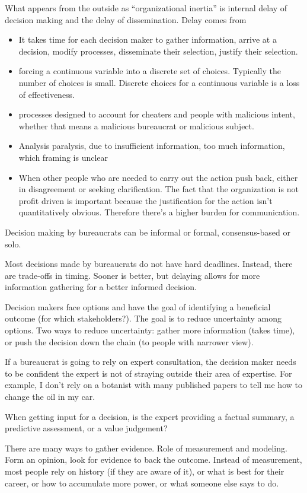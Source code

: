 What appears from the outside as ``organizational inertia'' is internal delay of decision making and the delay of dissemination. 
Delay comes from
\begin{itemize}
    \item It takes time for each decision maker to gather information, arrive at a decision, modify processes, disseminate their selection, justify their selection. 
    \item forcing a continuous variable into a discrete set of choices. Typically the number of choices is small. Discrete choices for a continuous variable is a loss of effectiveness.
    \item processes designed to account for cheaters and people with malicious intent, whether that means a malicious bureaucrat or malicious subject. 
\item Analysis paralysis, due to {insufficient information, too much information, which framing is unclear}
\item When other people who are needed to carry out the action push back, either in disagreement or seeking clarification. The fact that the organization is not profit driven is important because the justification for the action isn't quantitatively obvious. Therefore there's a higher burden for communication.
\end{itemize}


Decision making by bureaucrats can be informal or formal, consensus-based or solo. 

Most decisions made by bureaucrats do not have hard deadlines. Instead, there are trade-offs in timing. Sooner is better, but delaying allows for more information gathering for a better informed decision.




Decision makers face options and have the goal of identifying a beneficial outcome (for which stakeholders?). The goal is to reduce uncertainty among options. Two ways to reduce uncertainty: gather more information (takes time), or push the decision down the chain (to people with narrower view). 

If a bureaucrat is going to rely on expert consultation, the decision maker needs to be confident the expert is not of straying outside their area of expertise. For example, I don't rely on a botanist with many published papers to tell me how to change the oil in my car. 

When getting input for a decision, is the expert providing a factual summary, a predictive assessment, or a value judgement? 

There are many ways to gather evidence. 
Role of measurement and modeling. 
Form an opinion, look for evidence to back the outcome.
Instead of measurement, most people rely on history (if they are aware of it), or what is best for their career, or how to accumulate more power, or what someone else says to do.  
